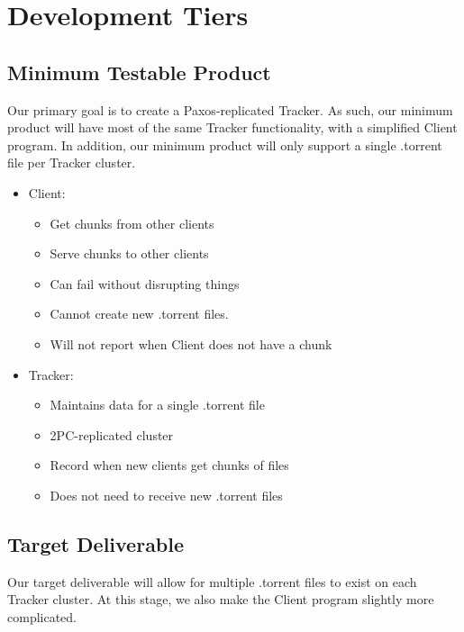 \documentclass[12pt]{article}
\begin{document}
\section*{Development Tiers}

\subsection*{Minimum Testable Product}
Our primary goal is to create a Paxos-replicated Tracker.
As such, our minimum product will have most of the same Tracker functionality,
with a simplified Client program.
In addition, our minimum product will only support a single .torrent file per
Tracker cluster.

\begin{itemize}
\item  Client:
    \begin{itemize}
    \item  Get chunks from other clients
    \item  Serve chunks to other clients
    \item  Can fail without disrupting things
    \item  Cannot create new .torrent files.
    \item  Will not report when Client does not have a chunk
    \end{itemize}
\item  Tracker:
    \begin{itemize}
    \item  Maintains data for a single .torrent file
    \item  2PC-replicated cluster
    \item  Record when new clients get chunks of files
    \item  Does not need to receive new .torrent files
    \end{itemize}
\end{itemize}

\subsection*{Target Deliverable}
Our target deliverable will allow for multiple .torrent files to exist on
each Tracker cluster.
At this stage, we also make the Client program slightly more complicated.
\end{document}
